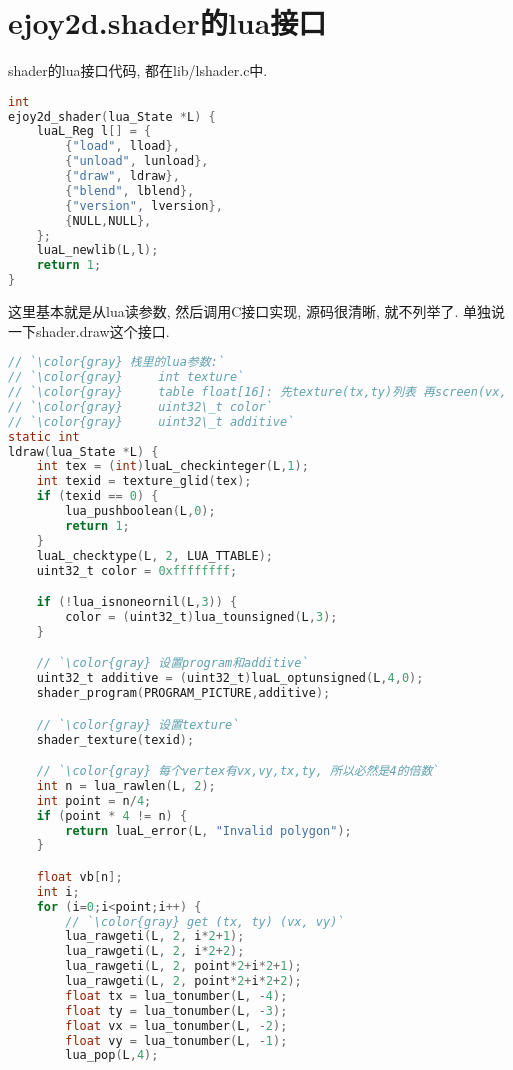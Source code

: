 \section {\ZHH ejoy2d.shader的lua接口} {

    {shader的lua接口代码, 都在lib/lshader.c中. }\par

\begin{lstlisting}[language=C]
int
ejoy2d_shader(lua_State *L) {
    luaL_Reg l[] = {
        {"load", lload},
        {"unload", lunload},
        {"draw", ldraw},
        {"blend", lblend},
        {"version", lversion},
        {NULL,NULL},
    };
    luaL_newlib(L,l);
    return 1;
}
\end{lstlisting}

    {这里基本就是从lua读参数, 然后调用C接口实现, 源码很清晰, 就不列举了. 单独说一下shader.draw这个接口.}\par

\begin{lstlisting}[language=C]
// `\color{gray} 栈里的lua参数:`
// `\color{gray}     int texture`
// `\color{gray}     table float[16]: 先texture(tx,ty)列表 再screen(vx, vy)列表`
// `\color{gray}     uint32\_t color`
// `\color{gray}     uint32\_t additive`
static int
ldraw(lua_State *L) {
    int tex = (int)luaL_checkinteger(L,1);
    int texid = texture_glid(tex);
    if (texid == 0) {
        lua_pushboolean(L,0);
        return 1;
    }
    luaL_checktype(L, 2, LUA_TTABLE);
    uint32_t color = 0xffffffff;

    if (!lua_isnoneornil(L,3)) {
        color = (uint32_t)lua_tounsigned(L,3);
    }

    // `\color{gray} 设置program和additive`
    uint32_t additive = (uint32_t)luaL_optunsigned(L,4,0);
    shader_program(PROGRAM_PICTURE,additive);

    // `\color{gray} 设置texture`
    shader_texture(texid);

    // `\color{gray} 每个vertex有vx,vy,tx,ty, 所以必然是4的倍数`
    int n = lua_rawlen(L, 2);
    int point = n/4;
    if (point * 4 != n) {
        return luaL_error(L, "Invalid polygon");
    }

    float vb[n];
    int i;
    for (i=0;i<point;i++) {
        // `\color{gray} get (tx, ty) (vx, vy)`
        lua_rawgeti(L, 2, i*2+1);
        lua_rawgeti(L, 2, i*2+2);
        lua_rawgeti(L, 2, point*2+i*2+1);
        lua_rawgeti(L, 2, point*2+i*2+2);
        float tx = lua_tonumber(L, -4);
        float ty = lua_tonumber(L, -3);
        float vx = lua_tonumber(L, -2);
        float vy = lua_tonumber(L, -1);
        lua_pop(L,4);


\end{lstlisting}}
